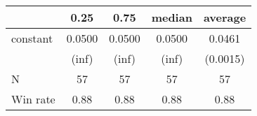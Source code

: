 \begin{tabular}{lcccc}
\hline
         &  0.25  &  0.75  & median & average   \\
\midrule
\midrule
constant & 0.0500 & 0.0500 & 0.0500 & 0.0461    \\
         & (inf)  & (inf)  & (inf)  & (0.0015)  \\
N        & 57     & 57     & 57     & 57        \\
Win rate & 0.88   & 0.88   & 0.88   & 0.88      \\
\hline
\end{tabular}